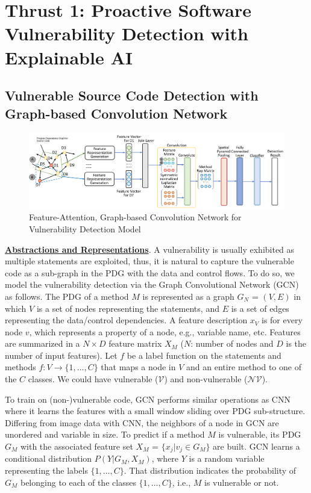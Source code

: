 \section{Thrust 1: Proactive Software Vulnerability Detection with Explainable AI}
\label{sec:thrust1}

\subsection{Vulnerable Source Code Detection with Graph-based Convolution Network} \label{sec:vd}

\begin{figure}[!hbt]
    \centering
    \includegraphics[width=6.5in]{graph-based-CNN.png}
    \vspace{-22pt}
    \caption{Feature-Attention, Graph-based Convolution Network for
      Vulnerability Detection Model}
    \label{fig:detection-model}
\end{figure}


\noindent \underline{\bf Abstractions and Representations}. A vulnerability is usually
exhibited as multiple statements are exploited, thus, it is natural to
capture the vulnerable code as a sub-graph in the PDG with the data
and control flows. To do so, we model the vulnerability
detection via the Graph Convolutional Network (GCN)~\cite{GCN16} as
follows. The PDG of a method $M$ is represented as a graph $G_N$ =
$(V,E)$ in which $V$ is a set of nodes representing the statements,
and $E$ is a set of edges representing the data/control dependencies.
%
A feature description $x_V$ is for every node $v$, which represents a
property of a node, e.g., variable name, etc. Features are summarized
in a $N \times D$ feature matrix $X_M$ ($N$: number of nodes and $D$
is the number of input features).
%
Let $f$ be a label function on the statements and methods $f: V
\rightarrow \{1,...,C\}$ that maps a node in $V$ and an entire method
to one of the $C$ classes. We could have vulnerable
($\mathcal{V}$) and non-vulnerable ($\mathcal{NV}$).


To train on (non-)vulnerable code, GCN
performs similar operations as CNN where it learns the features with a
small window sliding over PDG sub-structure. Differing from
image data with CNN, the neighbors of a node in GCN are unordered and
variable in size. To predict if a method $M$ is vulnerable, its PDG
$G_M$ with the associated feature set $X_M$ = $\{x_j|v_j \in G_M\}$
are built. GCN learns a conditional distribution $P(Y|G_M,X_M)$, where
$Y$ is a random variable representing the labels $\{1,...,C\}$. That
distribution indicates the probability of $G_M$ belonging to
each of the classes $\{1,...,C\}$, i.e., $M$ is vulnerable or not.

